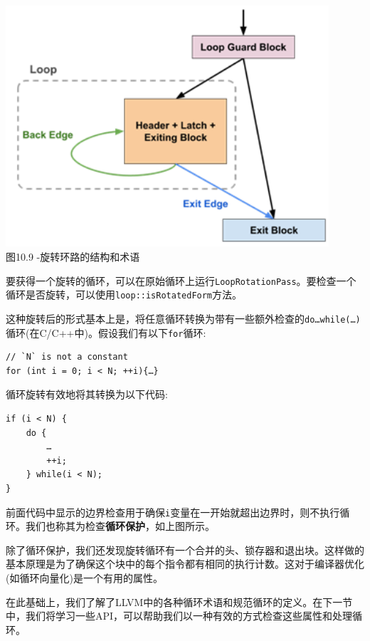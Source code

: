 \hspace*{\fill} \\ %
\begin{center}
\includegraphics[width=0.9\textwidth]{content/3/chapter10/images/9.png}\\
图10.9  -旋转环路的结构和术语
\end{center}

要获得一个旋转的循环，可以在原始循环上运行\texttt{LoopRotationPass}。要检查一个循环是否旋转，可以使用\texttt{loop::isRotatedForm}方法。

这种旋转后的形式基本上是，将任意循环转换为带有一些额外检查的\texttt{do{…}while(…)}循环(在C/C++中)。假设我们有以下\texttt{for}循环:

\begin{lstlisting}[style=styleCXX]
// `N` is not a constant
for (int i = 0; i < N; ++i){…}
\end{lstlisting}

循环旋转有效地将其转换为以下代码:

\begin{lstlisting}[style=styleCXX]
if (i < N) {
	do {
		…
		++i;
	} while(i < N);
}
\end{lstlisting}

前面代码中显示的边界检查用于确保\texttt{i}变量在一开始就超出边界时，则不执行循环。我们也称其为检查\textbf{循环保护}，如上图所示。

除了循环保护，我们还发现旋转循环有一个合并的头、锁存器和退出块。这样做的基本原理是为了确保这个块中的每个指令都有相同的执行计数。这对于编译器优化(如循环向量化)是一个有用的属性。

在此基础上，我们了解了LLVM中的各种循环术语和规范循环的定义。在下一节中，我们将学习一些API，可以帮助我们以一种有效的方式检查这些属性和处理循环。

